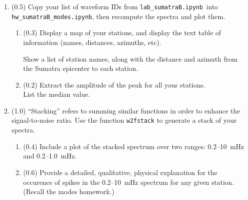 \documentclass[11pt,titlepage,fleqn]{article}
\newcommand{\tfilemodes}{{\tt hw\_sumatraB\_modes.ipynb}}
\newcommand{\tfilelab}{{\tt lab\_sumatraB.ipynb}}
\begin{document}
\begin{enumerate}

\item (0.5) Copy your list of waveform IDs from \tfilelab\ into \tfilemodes, then recompute the spectra and plot them.
%
\begin{enumerate}
\item (0.3) %
Display a map of your stations, and display the text table of information (names, distances, azimuths, etc).

Show a list of station names, along with the distance and azimuth from the Sumatra epicenter to each station.

\item (0.2) Extract the amplitude of the  peak for all your stations. \\
List the median value.
\end{enumerate}


\item (1.0) ``Stacking'' refers to summing similar functions in order to enhance the signal-to-noise ratio. Use the function \verb+w2fstack+ to generate a stack of your spectra.
%
\begin{enumerate}
\item (0.4) Include a plot of the stacked spectrum over two ranges: 0.2--10~mHz and 0.2--1.0~mHz.
\item (0.6) Provide a detailed, qualitative, physical explanation for the occurence of spikes in the 0.2--10~mHz spectrum for any given station. (Recall the modes homework.)
\end{enumerate}
%



\end{enumerate}
\end{document}
